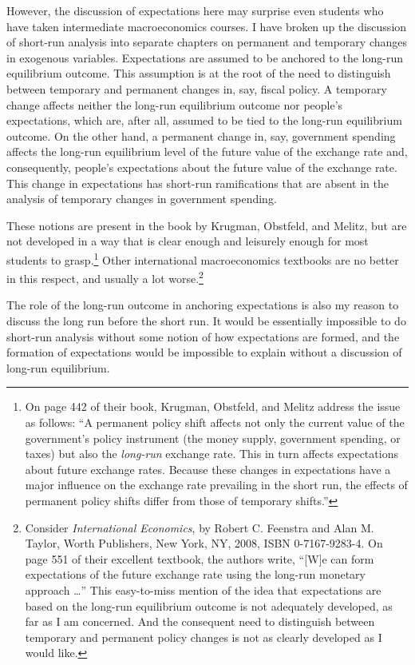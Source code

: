 \documentclass[
  letterpaper,
]{book}
\begin{document}
However, the discussion of expectations here may surprise even students
who have taken intermediate macroeconomics courses. I have broken up the
discussion of short-run analysis into separate chapters on permanent and
temporary changes in exogenous variables. Expectations are assumed to be
anchored to the long-run equilibrium outcome. This assumption is at the
root of the need to distinguish between temporary and permanent changes
in, say, fiscal policy. A temporary change affects neither the long-run
equilibrium outcome nor people's expectations, which are, after all,
assumed to be tied to the long-run equilibrium outcome. On the other
hand, a permanent change in, say, government spending affects the
long-run equilibrium level of the future value of the exchange rate and,
consequently, people's expectations about the future value of the
exchange rate. This change in expectations has short-run ramifications
that are absent in the analysis of temporary changes in government
spending.

These notions are present in the book by Krugman, Obstfeld, and Melitz,
but are not developed in a way that is clear enough and leisurely enough
for most students to grasp.\footnote{On page 442 of their book, Krugman,
  Obstfeld, and Melitz address the issue as follows: ``A permanent
  policy shift affects not only the current value of the government's
  policy instrument (the money supply, government spending, or taxes)
  but also the \emph{long-run} exchange rate. This in turn affects
  expectations about future exchange rates. Because these changes in
  expectations have a major influence on the exchange rate prevailing in
  the short run, the effects of permanent policy shifts differ from
  those of temporary shifts.''} Other international macroeconomics
textbooks are no better in this respect, and usually a lot
worse.\footnote{Consider \emph{International Economics}, by Robert C.
  Feenstra and Alan M. Taylor, Worth Publishers, New York, NY, 2008,
  ISBN 0-7167-9283-4. On page 551 of their excellent textbook, the
  authors write, ``{[}W{]}e can form expectations of the future exchange
  rate using the long-run monetary approach \ldots{}'' This easy-to-miss
  mention of the idea that expectations are based on the long-run
  equilibrium outcome is not adequately developed, as far as I am
  concerned. And the consequent need to distinguish between temporary
  and permanent policy changes is not as clearly developed as I would
  like.}

The role of the long-run outcome in anchoring expectations is also my
reason to discuss the long run before the short run. It would be
essentially impossible to do short-run analysis without some notion of
how expectations are formed, and the formation of expectations would be
impossible to explain without a discussion of long-run equilibrium.
\end{document}
